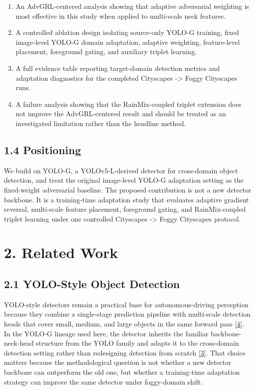 \documentclass[
  11pt,
]{article}
\providecommand{\tightlist}{%
  \setlength{\itemsep}{0pt}\setlength{\parskip}{0pt}}
\begin{document}
\begin{enumerate}
\def\labelenumi{\arabic{enumi}.}
\tightlist
\item
  An AdvGRL-centered analysis showing that adaptive adversarial
  weighting is most effective in this study when applied to multi-scale
  neck features.
\item
  A controlled ablation design isolating source-only YOLO-G training,
  fixed image-level YOLO-G domain adaptation, adaptive weighting,
  feature-level placement, foreground gating, and auxiliary triplet
  learning.
\item
  A full evidence table reporting target-domain detection metrics and
  adaptation diagnostics for the completed Cityscapes -\textgreater{}
  Foggy Cityscapes runs.
\item
  A failure analysis showing that the RainMix-coupled triplet extension
  does not improve the AdvGRL-centered result and should be treated as
  an investigated limitation rather than the headline method.
\end{enumerate}

\hypertarget{positioning}{%
\subsection{1.4 Positioning}\label{positioning}}

We build on YOLO-G, a YOLOv5-L-derived detector for cross-domain object
detection, and treat the original image-level YOLO-G adaptation setting
as the fixed-weight adversarial baseline. The proposed contribution is
not a new detector backbone. It is a training-time adaptation study that
evaluates adaptive gradient reversal, multi-scale feature placement,
foreground gating, and RainMix-coupled triplet learning under one
controlled Cityscapes -\textgreater{} Foggy Cityscapes protocol.

\hypertarget{related-work}{%
\section{2. Related Work}\label{related-work}}

\hypertarget{yolo-style-object-detection}{%
\subsection{2.1 YOLO-Style Object
Detection}\label{yolo-style-object-detection}}

YOLO-style detectors remain a practical base for autonomous-driving
perception because they combine a single-stage prediction pipeline with
multi-scale detection heads that cover small, medium, and large objects
in the same forward pass
\protect\hyperlink{ref-jocher2022yolov5}{{[}4{]}}. In the YOLO-G lineage
used here, the detector inherits the familiar backbone-neck-head
structure from the YOLO family and adapts it to the cross-domain
detection setting rather than redesigning detection from scratch
\protect\hyperlink{ref-wei2023yolog}{{[}3{]}}. That choice matters
because the methodological question is not whether a new detector
backbone can outperform the old one, but whether a training-time
adaptation strategy can improve the same detector under foggy-domain
shift.
\end{document}
